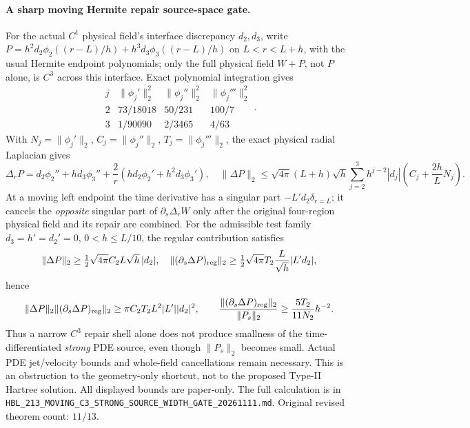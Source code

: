 \paragraph{A sharp moving Hermite repair source-space gate.}
For the actual $C^1$ physical field's interface discrepancy $d_2,d_3$,
write $P=h^2d_2\phi_2((r-L)/h)+h^3d_3\phi_3((r-L)/h)$
on $L<r<L+h$, with the usual Hermite endpoint polynomials; only the full
physical field $W+P$, not $P$ alone, is $C^3$ across this interface. Exact polynomial integration gives
\[
 \begin{array}{c|ccc}
 j&\|\phi_j'\|_2^2&\|\phi_j''\|_2^2&\|\phi_j'''\|_2^2\\ \hline
 2&73/18018&50/231&100/7\\
 3&1/90090&2/3465&4/63
 \end{array}.
\]
With $N_j=\|\phi_j'\|_2$, $C_j=\|\phi_j''\|_2$,
$T_j=\|\phi_j'''\|_2$, the exact physical radial Laplacian gives
\[
 \Delta_rP=d_2\phi_2''+hd_3\phi_3''
   +\frac2r(hd_2\phi_2'+h^2d_3\phi_3'),\quad
 \|\Delta P\|_2\le \sqrt{4\pi}(L+h)\sqrt h
 \sum_{j=2}^3h^{j-2}|d_j|
  \left(C_j+\frac{2h}{L}N_j\right).
\]
At a moving left endpoint the time derivative has a singular part
$-L'd_2\delta_{r=L}$; it cancels the \emph{opposite} singular
part of $\partial_s\Delta_rW$ only after the original four-region
physical field and its repair are combined.
For the admissible test family $d_3=h'=d_2'=0$, $0<h\le L/10$,
the regular contribution satisfies
\[
 \|\Delta P\|_2\ge \tfrac12\sqrt{4\pi}C_2L\sqrt h\,|d_2|,
 \quad
 \|(\partial_s\Delta P)_{\rm reg}\|_2
 \ge\tfrac12\sqrt{4\pi}T_2
 \frac{L}{\sqrt h}|L'd_2|,
\]
hence
\[
 \|\Delta P\|_2\|(\partial_s\Delta P)_{\rm reg}\|_2
 \ge\pi C_2T_2 L^2|L'||d_2|^2,\qquad
 \frac{\|(\partial_s\Delta P)_{\rm reg}\|_2}{\|P_s\|_2}
 \ge\frac{5T_2}{11N_2}h^{-2}.
\]
Thus a narrow $C^3$ repair shell alone does not produce smallness
of the time-differentiated \emph{strong} PDE source, even though
$\|P_s\|_2$ becomes small. Actual PDE jet/velocity bounds and
whole-field cancellations remain necessary. This is an obstruction
to the geometry-only shortcut, not to the proposed Type-II
Hartree solution. All displayed bounds are paper-only.
The full calculation is in
\texttt{HBL\_213\_MOVING\_C3\_STRONG\_SOURCE\_WIDTH\_GATE\_20261111.md}.
Original revised theorem count: $11/13$.
